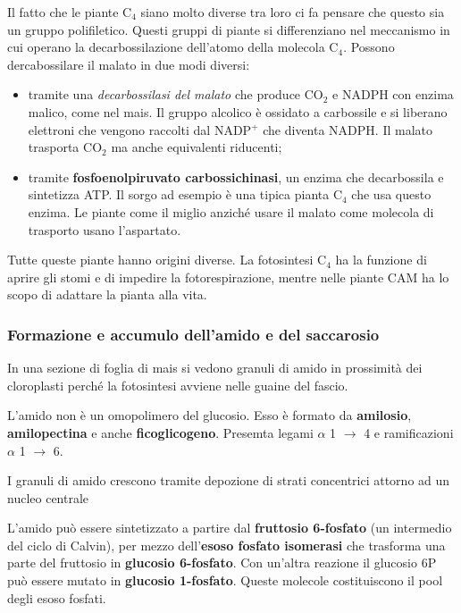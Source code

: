 \documentclass[]{article}
\begin{document}
Il fatto che le piante C$_4$ siano molto diverse tra loro ci fa pensare
che questo sia un gruppo polifiletico. Questi gruppi di piante si
differenziano nel meccanismo in cui operano la decarbossilazione
dell'atomo della molecola C$_4$. Possono dercabossilare il malato in due
modi diversi:

\begin{itemize}
\item
  tramite una \emph{decarbossilasi del malato} che produce CO$_2$ e
  NADPH con enzima malico, come nel mais. Il gruppo alcolico è ossidato
  a carbossile e si liberano elettroni che vengono raccolti dal NADP$^+$
  che diventa NADPH. Il malato trasporta CO$_2$ ma anche equivalenti
  riducenti;
\item
  tramite \textbf{fosfoenolpiruvato carbossichinasi}, un enzima che
  decarbossila e sintetizza ATP. Il sorgo ad esempio è una tipica pianta
  C$_4$ che usa questo enzima. Le piante come il miglio anziché usare il
  malato come molecola di trasporto usano l'aspartato.
\end{itemize}

Tutte queste piante hanno origini diverse. La fotosintesi C$_4$ ha la
funzione di aprire gli stomi e di impedire la fotorespirazione, mentre
nelle piante CAM ha lo scopo di adattare la pianta alla vita.

\subsubsection{Formazione e accumulo dell'amido e del
saccarosio}\label{formazione-e-accumulo-dellamido-e-del-saccarosio}

In una sezione di foglia di mais si vedono granuli di amido in
prossimità dei cloroplasti perché la fotosintesi avviene nelle guaine
del fascio.

L'amido non è un omopolimero del glucosio. Esso è formato da
\textbf{amilosio}, \textbf{amilopectina} e anche \textbf{ficoglicogeno}.
Presemta legami $\alpha$ 1 $\rightarrow$ 4 e ramificazioni $\alpha$ 1
$\rightarrow$ 6.

I granuli di amido crescono tramite depozione di strati concentrici
attorno ad un nucleo centrale

L'amido può essere sintetizzato a partire dal \textbf{fruttosio
6-fosfato} (un intermedio del ciclo di Calvin), per mezzo
dell'\textbf{esoso fosfato isomerasi} che trasforma una parte del
fruttosio in \textbf{glucosio 6-fosfato}. Con un'altra reazione il
glucosio 6P può essere mutato in \textbf{glucosio 1-fosfato}. Queste
molecole costituiscono il pool degli esoso fosfati.
\end{document}
